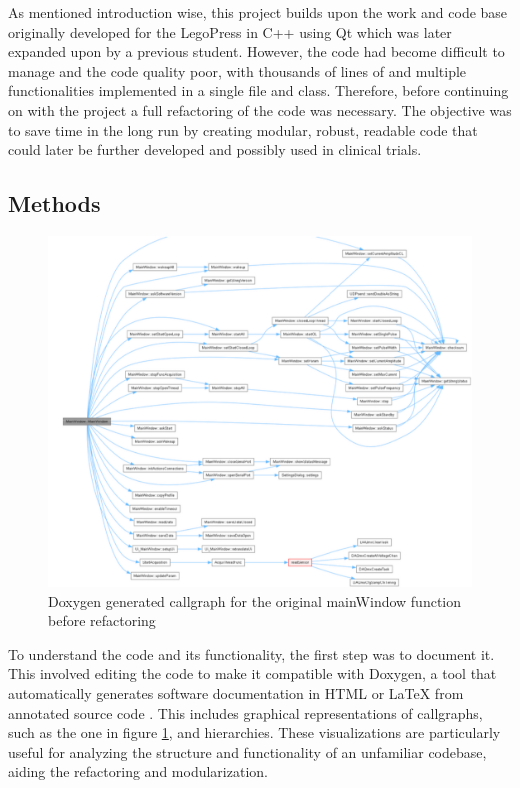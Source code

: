 

As mentioned introduction wise, this project builds upon the work and code base originally developed for the LegoPress \cite{olivier_legopress_2014} in C++ using Qt which was later expanded upon by a previous student. However, the code had become difficult to manage and the code quality poor, with thousands of lines of and multiple functionalities implemented in a single file and class. Therefore, before continuing on with the project a full refactoring of the code was necessary. The objective was to save time in the long run by creating modular, robust, readable code that could later be further developed and possibly used in clinical trials.

\subsection{Methods}
\begin{figure} [h]
	\centering
	\includegraphics[width=0.9\linewidth]{images/oldDoxy.png}
	\caption{Doxygen generated callgraph for the original mainWindow function before refactoring}
	\label{fig:oldDoxy}
\end{figure}

To understand the code and its functionality, the first step was to document it. This involved editing the code to make it compatible with Doxygen, a tool that automatically generates software documentation in HTML or LaTeX from annotated source code \cite{noauthor_doxygen_nodate}. This includes graphical representations of callgraphs, such as the one in figure \ref{fig:oldDoxy}, and hierarchies. These visualizations are particularly useful for analyzing the structure and functionality of an unfamiliar codebase, aiding the refactoring and modularization.

